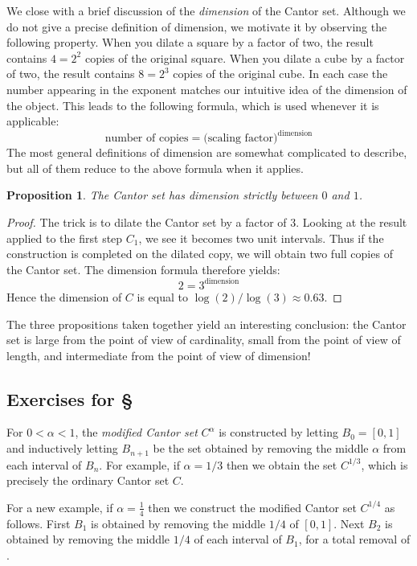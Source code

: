 \documentclass[11pt,oneside]{amsbook}
\theoremstyle{definition}
\theoremstyle{plain}
\newtheorem{proposition}[theorem]{Proposition}
\theoremstyle{definition}
\theoremstyle{remark}
\numberwithin{equation}{section}
\numberwithin{figure}{section}
\begin{document}
We close with a brief discussion of the \emph{dimension} of the Cantor set. Although we do not give a precise definition of dimension, we motivate it by observing the following property. When you dilate a square by a factor of two, the result contains $4=2^2$ copies of the original square. When you dilate a cube by a factor of two, the result contains $8=2^3$ copies of the original cube. In each case the number appearing in the exponent matches our intuitive idea of the dimension of the object. This leads to the following formula, which is used whenever it is applicable:
\[\text{number of copies}=\text{(scaling factor)}^\text{dimension}
\]
The most general definitions of dimension are somewhat complicated to describe, but all of them reduce to the above formula when it applies.

\begin{proposition}
  The Cantor set has dimension strictly between $0$ and $1$.
\end{proposition}

\begin{proof}
  The trick is to dilate the Cantor set by a factor of $3$. Looking at the result applied to the first step $C_1$, we see it becomes two unit intervals. Thus if the construction is completed on the dilated copy, we will obtain two full copies of the Cantor set. The dimension formula therefore yields:
\[2=3^{\text{dimension}}
\]
Hence the dimension of $C$ is equal to $\log(2)/\log(3)\approx0.63$.
\end{proof}

The three propositions taken together yield an interesting conclusion: the Cantor set is large from the point of view of cardinality, small from the point of view of length, and intermediate from the point of view of dimension!

\newpage
\subsection*{Exercises for \S \thesection}

For $0<\alpha<1$, the \emph{modified Cantor set} $C^\alpha$ is constructed by letting $B_0=[0,1]$ and inductively letting $B_{n+1}$ be the set obtained by removing the middle $\alpha$ from each interval of $B_n$. For example, if $\alpha=1/3$ then we obtain the set $C^{1/3}$, which is precisely the ordinary Cantor set $C$.

For a new example, if $\alpha=\frac14$ then we construct the modified Cantor set $C^{1/4}$ as follows. First $B_1$ is obtained by removing the middle $1/4$ of $[0,1]$. Next $B_2$ is obtained by removing the middle $1/4$ of each interval of $B_1$, for a total removal of \underline{\hspace{1in}}.
\end{document}

